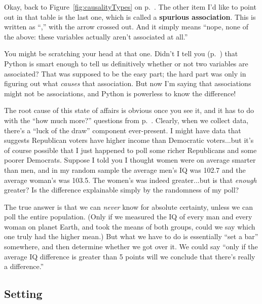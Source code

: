 
Okay, back to Figure~\ref{fig:causalityTypes} on
p.~\pageref{fig:causalityTypes}. The other item I'd like to point out in that
table is the last one, which is called a \textbf{spurious association}. This is
written as ``,'' with the arrow crossed out. And it simply
means ``nope, none of the above: these variables actually aren't associated at
all.''

You might be scratching your head at that one. Didn't I tell you
(p.~\pageref{pythonAssociation}) that Python is smart enough to tell us
definitively whether or not two variables are associated? That was supposed to
be the easy part; the hard part was only in figuring out what \textit{causes}
that association. But now I'm saying that associations might not be
associations, and Python is powerless to know the difference!

The root cause of this state of affairs is obvious once you see it, and it has
to do with the ``how much more?'' questions from p.~\pageref{howMuchMore}.
Clearly, when we collect data, there's a ``luck of the draw'' component
ever-present. I might have data that suggests Republican voters have higher
income than Democratic voters...but it's of course possible that I just
happened to poll some richer Republicans and some poorer Democrats. Suppose I
told you I thought women were on average smarter than men, and in my random
sample the average men's IQ was 102.7 and the average woman's was 103.5. The
women's was indeed greater...but is that \textit{enough} greater? Is the
difference explainable simply by the randomness of my poll?

The true answer is that we can \textit{never} know for absolute certainty,
unless we can poll the entire population. (Only if we measured the IQ of every
man and every woman on planet Earth, and took the means of both groups, could
we say which one truly had the higher mean.) But what we have to do is
essentially ``set a bar'' somewhere, and then determine whether we got over it.
We could say ``only if the average IQ difference is greater than 5 points will
we conclude that there's really a difference.''

\subsection{Setting }

